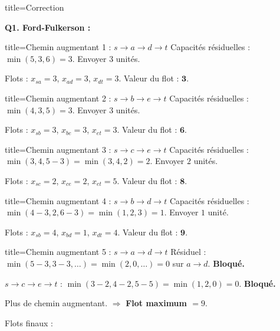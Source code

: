 \documentclass[12pt,a4paper]{article}
\begin{document}
\begin{correction}{title=Correction}

\textbf{Q1. Ford-Fulkerson :}

\begin{etape}{title=Chemin augmentant 1 : $s \to a \to d \to t$}
Capacit\'es r\'esiduelles : $\min(5, 3, 6) = 3$. Envoyer $3$ unit\'es.

Flots : $x_{sa}=3$, $x_{ad}=3$, $x_{dt}=3$. Valeur du flot : $\mathbf{3}$.
\end{etape}

\begin{etape}{title=Chemin augmentant 2 : $s \to b \to e \to t$}
Capacit\'es r\'esiduelles : $\min(4, 3, 5) = 3$. Envoyer $3$ unit\'es.

Flots : $x_{sb}=3$, $x_{be}=3$, $x_{et}=3$. Valeur du flot : $\mathbf{6}$.
\end{etape}

\begin{etape}{title=Chemin augmentant 3 : $s \to c \to e \to t$}
Capacit\'es r\'esiduelles : $\min(3, 4, 5-3) = \min(3, 4, 2) = 2$. Envoyer $2$ unit\'es.

Flots : $x_{sc}=2$, $x_{ce}=2$, $x_{et}=5$. Valeur du flot : $\mathbf{8}$.
\end{etape}

\begin{etape}{title=Chemin augmentant 4 : $s \to b \to d \to t$}
Capacit\'es r\'esiduelles : $\min(4-3, 2, 6-3) = \min(1, 2, 3) = 1$. Envoyer $1$ unit\'e.

Flots : $x_{sb}=4$, $x_{bd}=1$, $x_{dt}=4$. Valeur du flot : $\mathbf{9}$.
\end{etape}

\begin{etape}{title=Chemin augmentant 5 : $s \to a \to d \to t$}
R\'esiduel : $\min(5-3, 3-3, \ldots) = \min(2, 0, \ldots) = 0$ sur $a \to d$. \textbf{Bloqu\'e.}

$s \to c \to e \to t$ : $\min(3-2, 4-2, 5-5) = \min(1, 2, 0) = 0$. \textbf{Bloqu\'e.}

Plus de chemin augmentant. $\Rightarrow$ \textbf{Flot maximum $= 9$}.
\end{etape}

\medskip
Flots finaux :


\end{correction}
\end{document}
